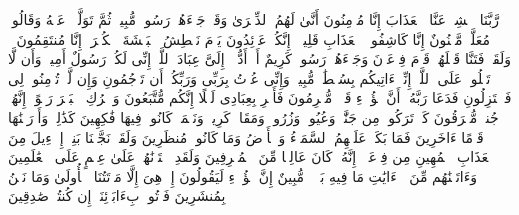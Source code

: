 رَّبَّنَا ٱكۡشِفۡ عَنَّا ٱلۡعَذَابَ إِنَّا مُؤۡمِنُونَ%
\stopbuffer%
\startbuffer[\q:44:13]
أَنَّىٰ لَهُمُ ٱلذِّكۡرَىٰ وَقَدۡ جَاۤءَهُمۡ رَسُولࣱ مُّبِینࣱ%
\stopbuffer%
\startbuffer[\q:44:14]
ثُمَّ تَوَلَّوۡا۟ عَنۡهُ وَقَالُوا۟ مُعَلَّمࣱ مَّجۡنُونٌ%
\stopbuffer%
\startbuffer[\q:44:15]
إِنَّا كَاشِفُوا۟ ٱلۡعَذَابِ قَلِیلًاۚ إِنَّكُمۡ عَاۤئِدُونَ%
\stopbuffer%
\startbuffer[\q:44:16]
یَوۡمَ نَبۡطِشُ ٱلۡبَطۡشَةَ ٱلۡكُبۡرَىٰۤ إِنَّا مُنتَقِمُونَ%
\stopbuffer%
\startbuffer[\q:44:17]
۞ وَلَقَدۡ فَتَنَّا قَبۡلَهُمۡ قَوۡمَ فِرۡعَوۡنَ وَجَاۤءَهُمۡ رَسُولࣱ كَرِیمٌ%
\stopbuffer%
\startbuffer[\q:44:18]
أَنۡ أَدُّوۤا۟ إِلَیَّ عِبَادَ ٱللَّهِۖ إِنِّی لَكُمۡ رَسُولٌ أَمِینࣱ%
\stopbuffer%
\startbuffer[\q:44:19]
وَأَن لَّا تَعۡلُوا۟ عَلَى ٱللَّهِۖ إِنِّیۤ ءَاتِیكُم بِسُلۡطَٰنࣲ مُّبِینࣲ%
\stopbuffer%
\startbuffer[\q:44:20]
وَإِنِّی عُذۡتُ بِرَبِّی وَرَبِّكُمۡ أَن تَرۡجُمُونِ%
\stopbuffer%
\startbuffer[\q:44:21]
وَإِن لَّمۡ تُؤۡمِنُوا۟ لِی فَٱعۡتَزِلُونِ%
\stopbuffer%
\startbuffer[\q:44:22]
فَدَعَا رَبَّهُۥۤ أَنَّ هَٰۤؤُلَاۤءِ قَوۡمࣱ مُّجۡرِمُونَ%
\stopbuffer%
\startbuffer[\q:44:23]
فَأَسۡرِ بِعِبَادِی لَیۡلًا إِنَّكُم مُّتَّبَعُونَ%
\stopbuffer%
\startbuffer[\q:44:24]
وَٱتۡرُكِ ٱلۡبَحۡرَ رَهۡوًاۖ إِنَّهُمۡ جُندࣱ مُّغۡرَقُونَ%
\stopbuffer%
\startbuffer[\q:44:25]
كَمۡ تَرَكُوا۟ مِن جَنَّٰتࣲ وَعُیُونࣲ%
\stopbuffer%
\startbuffer[\q:44:26]
وَزُرُوعࣲ وَمَقَامࣲ كَرِیمࣲ%
\stopbuffer%
\startbuffer[\q:44:27]
وَنَعۡمَةࣲ كَانُوا۟ فِیهَا فَٰكِهِینَ%
\stopbuffer%
\startbuffer[\q:44:28]
كَذَٰلِكَۖ وَأَوۡرَثۡنَٰهَا قَوۡمًا ءَاخَرِینَ%
\stopbuffer%
\startbuffer[\q:44:29]
فَمَا بَكَتۡ عَلَیۡهِمُ ٱلسَّمَاۤءُ وَٱلۡأَرۡضُ وَمَا كَانُوا۟ مُنظَرِینَ%
\stopbuffer%
\startbuffer[\q:44:30]
وَلَقَدۡ نَجَّیۡنَا بَنِیۤ إِسۡرَٰۤءِیلَ مِنَ ٱلۡعَذَابِ ٱلۡمُهِینِ%
\stopbuffer%
\startbuffer[\q:44:31]
مِن فِرۡعَوۡنَۚ إِنَّهُۥ كَانَ عَالِیࣰا مِّنَ ٱلۡمُسۡرِفِینَ%
\stopbuffer%
\startbuffer[\q:44:32]
وَلَقَدِ ٱخۡتَرۡنَٰهُمۡ عَلَىٰ عِلۡمٍ عَلَى ٱلۡعَٰلَمِینَ%
\stopbuffer%
\startbuffer[\q:44:33]
وَءَاتَیۡنَٰهُم مِّنَ ٱلۡءَایَٰتِ مَا فِیهِ بَلَٰۤؤࣱا۟ مُّبِینٌ%
\stopbuffer%
\startbuffer[\q:44:34]
إِنَّ هَٰۤؤُلَاۤءِ لَیَقُولُونَ%
\stopbuffer%
\startbuffer[\q:44:35]
إِنۡ هِیَ إِلَّا مَوۡتَتُنَا ٱلۡأُولَىٰ وَمَا نَحۡنُ بِمُنشَرِینَ%
\stopbuffer%
\startbuffer[\q:44:36]
فَأۡتُوا۟ بِءَابَاۤئِنَاۤ إِن كُنتُمۡ صَٰدِقِینَ%
\stopbuffer%
